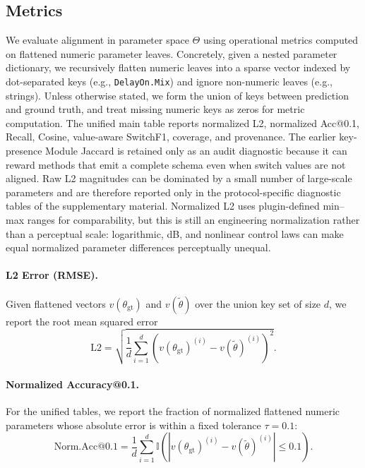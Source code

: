 \subsection{Metrics}
\label{ssec:metrics}
We evaluate alignment in parameter space $\Theta$ using operational metrics computed on flattened numeric parameter leaves. Concretely, given a nested parameter dictionary, we recursively flatten numeric leaves into a sparse vector indexed by dot-separated keys (e.g., \texttt{DelayOn.Mix}) and ignore non-numeric leaves (e.g., strings). Unless otherwise stated, we form the union of keys between prediction and ground truth, and treat missing numeric keys as zeros for metric computation. The unified main table reports normalized L2, normalized Acc@0.1, Recall, Cosine, value-aware SwitchF1, coverage, and provenance. The earlier key-presence Module Jaccard is retained only as an audit diagnostic because it can reward methods that emit a complete schema even when switch values are not aligned. Raw L2 magnitudes can be dominated by a small number of large-scale parameters and are therefore reported only in the protocol-specific diagnostic tables of the supplementary material. Normalized L2 uses plugin-defined min--max ranges for comparability, but this is still an engineering normalization rather than a perceptual scale: logarithmic, dB, and nonlinear control laws can make equal normalized parameter differences perceptually unequal.

\paragraph{L2 Error (RMSE).}
Given flattened vectors $v(\theta_{\text{gt}})$ and $v(\tilde{\theta})$ over the union key set of size $d$, we report the root mean squared error
\begin{equation}
	\text{L2} = \sqrt{\frac{1}{d}\sum_{i=1}^{d}\left(v(\theta_{\text{gt}})^{(i)} - v(\tilde{\theta})^{(i)}\right)^2}.
\end{equation}

\paragraph{Normalized Accuracy@0.1.}
For the unified tables, we report the fraction of normalized flattened numeric parameters whose absolute error is within a fixed tolerance $\tau=0.1$:
\begin{equation}
	\text{Norm.Acc@0.1} = \frac{1}{d}\sum_{i=1}^{d}\mathbb{I}\left(\left|v(\theta_{\text{gt}})^{(i)} - v(\tilde{\theta})^{(i)}\right| \leq 0.1\right).
\end{equation}

